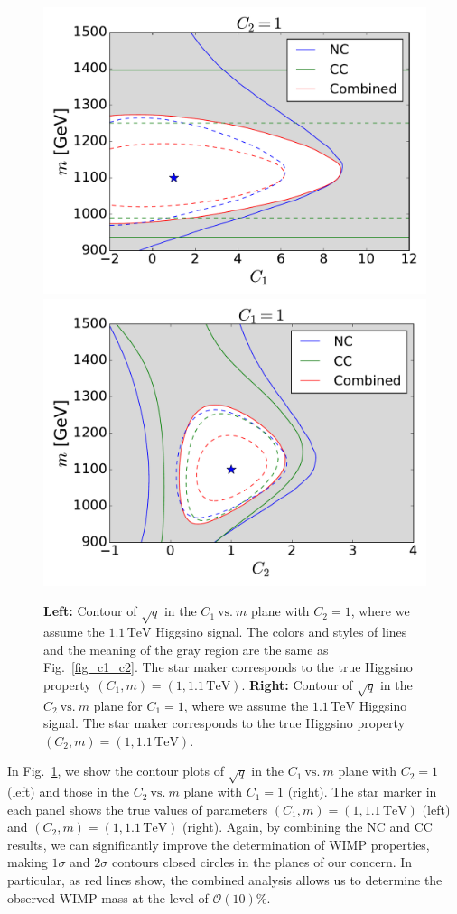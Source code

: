 \documentclass[12pt,twoside,book]{article}
\begin{document}
\begin{figure}[t]
  \centering
  \includegraphics[width=0.48\linewidth]{C1_vs_mass_Higgsino.pdf}
  \includegraphics[width=0.48\linewidth]{C2_vs_mass_Higgsino.pdf}
  \caption{
    \textbf{Left:} Contour of $\sqrt{q}$ in the $C_1~\mathrm{vs.}~m$ plane with $C_2 = 1$, where we assume the $1.1\,\mathrm{TeV}$ Higgsino signal.
    The colors and styles of lines and the meaning of the gray region are the same as Fig.~\ref{fig_c1_c2}.
    The star maker corresponds to the true Higgsino property $(C_1, m) = (1, 1.1\,\mathrm{TeV})$.
    \textbf{Right:} Contour of $\sqrt{q}$ in the $C_2~\mathrm{vs.}~m$ plane for $C_1 = 1$, where we assume the $1.1\,\mathrm{TeV}$ Higgsino signal.
    The star maker corresponds to the true Higgsino property $(C_2, m) = (1, 1.1\,\mathrm{TeV})$.
 }
 \label{fig_c1_m}
\end{figure}

In Fig.~\ref{fig_c1_m}, we show the contour plots of $\sqrt{q}$ in the $C_1~\mathrm{vs.}~m$ plane with $C_2=1$ (left) and those in the $C_2~\mathrm{vs.}~m$ plane with $C_1=1$ (right).
The star marker in each panel shows the true values of parameters $(C_1, m) = (1, 1.1\,\mathrm{TeV})$ (left) and $(C_2, m) = (1, 1.1\,\mathrm{TeV})$ (right).
Again, by combining the NC and CC results, we can significantly improve the determination of WIMP properties, making $1\sigma$ and $2\sigma$ contours closed circles in the planes of our concern.
In particular, as red lines show, the combined analysis allows us to determine the observed WIMP mass at the level of $\mathcal{O}(10)\%$.
\end{document}
